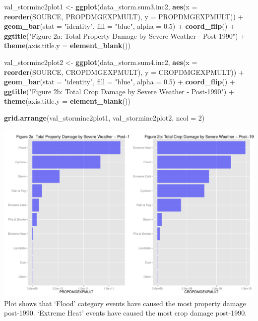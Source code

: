 \documentclass[]{article}
\newenvironment{Shaded}{\begin{snugshade}}{\end{snugshade}}
\newcommand{\KeywordTok}[1]{\textcolor[rgb]{0.13,0.29,0.53}{\textbf{{#1}}}}
\newcommand{\DataTypeTok}[1]{\textcolor[rgb]{0.13,0.29,0.53}{{#1}}}
\newcommand{\DecValTok}[1]{\textcolor[rgb]{0.00,0.00,0.81}{{#1}}}
\newcommand{\FloatTok}[1]{\textcolor[rgb]{0.00,0.00,0.81}{{#1}}}
\newcommand{\StringTok}[1]{\textcolor[rgb]{0.31,0.60,0.02}{{#1}}}
\newcommand{\NormalTok}[1]{{#1}}
\begin{document}
\begin{Shaded}
\begin{Highlighting}[]
\NormalTok{val_storminc2plot1  <-}\StringTok{ }\KeywordTok{ggplot}\NormalTok{(data_storm.sum3.inc2, }\KeywordTok{aes}\NormalTok{(}\DataTypeTok{x =} \KeywordTok{reorder}\NormalTok{(SOURCE, PROPDMGEXPMULT), }\DataTypeTok{y =} \NormalTok{PROPDMGEXPMULT)) +}
\StringTok{  }\KeywordTok{geom_bar}\NormalTok{(}\DataTypeTok{stat =} \StringTok{"identity"}\NormalTok{, }\DataTypeTok{fill =} \StringTok{"blue"}\NormalTok{, }\DataTypeTok{alpha =} \FloatTok{0.5}\NormalTok{) +}
\StringTok{  }\KeywordTok{coord_flip}\NormalTok{() +}
\StringTok{  }\KeywordTok{ggtitle}\NormalTok{(}\StringTok{"Figure 2a: Total Property Damage by Severe Weather - Post-1990"}\NormalTok{) +}
\StringTok{  }\KeywordTok{theme}\NormalTok{(}\DataTypeTok{axis.title.y =} \KeywordTok{element_blank}\NormalTok{())}

\NormalTok{val_storminc2plot2  <-}\StringTok{ }\KeywordTok{ggplot}\NormalTok{(data_storm.sum4.inc2, }\KeywordTok{aes}\NormalTok{(}\DataTypeTok{x =} \KeywordTok{reorder}\NormalTok{(SOURCE, CROPDMGEXPMULT), }\DataTypeTok{y =} \NormalTok{CROPDMGEXPMULT)) +}
\StringTok{  }\KeywordTok{geom_bar}\NormalTok{(}\DataTypeTok{stat =} \StringTok{"identity"}\NormalTok{, }\DataTypeTok{fill =} \StringTok{"blue"}\NormalTok{, }\DataTypeTok{alpha =} \FloatTok{0.5}\NormalTok{) +}
\StringTok{  }\KeywordTok{coord_flip}\NormalTok{() +}
\StringTok{  }\KeywordTok{ggtitle}\NormalTok{(}\StringTok{"Figure 2b: Total Crop Damage by Severe Weather - Post-1990"}\NormalTok{) +}
\StringTok{  }\KeywordTok{theme}\NormalTok{(}\DataTypeTok{axis.title.y =} \KeywordTok{element_blank}\NormalTok{())}

\KeywordTok{grid.arrange}\NormalTok{(val_storminc2plot1, val_storminc2plot2, }\DataTypeTok{ncol =} \DecValTok{2}\NormalTok{)}
\end{Highlighting}
\end{Shaded}

\includegraphics{figure/unnamed-chunk-12-1.pdf} Plot shows that `Flood'
category events have caused the most property damage post-1990. `Extreme
Heat' events have caused the most crop damage post-1990.
\end{document}
